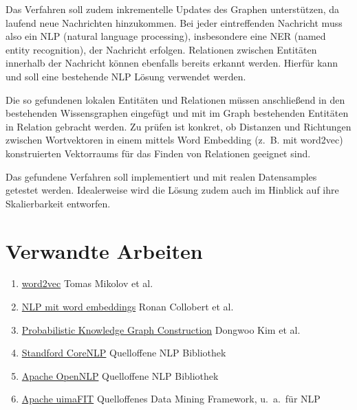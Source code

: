 \documentclass[12pt,a4paper,bibliography=totocnumbered,listof=totocnumbered]{scrartcl}
\begin{document}
Das Verfahren soll zudem inkrementelle Updates des Graphen unterstützen, da laufend neue Nachrichten hinzukommen. Bei jeder eintreffenden Nachricht muss also ein NLP (natural language processing), insbesondere eine NER (named entity recognition), der Nachricht erfolgen. Relationen zwischen Entitäten innerhalb der Nachricht können ebenfalls bereits erkannt werden. Hierfür kann und soll eine bestehende NLP Lösung verwendet werden.

Die so gefundenen lokalen Entitäten und Relationen müssen anschließend in den bestehenden Wissensgraphen eingefügt und mit im Graph bestehenden Entitäten in Relation gebracht werden. Zu prüfen ist konkret, ob Distanzen und Richtungen zwischen Wortvektoren in einem mittels Word Embedding (z.~B. mit word2vec) konstruierten Vektorraums für das Finden von Relationen geeignet sind.

Das gefundene Verfahren soll implementiert und mit realen Datensamples getestet werden. Idealerweise wird die Lösung zudem auch im Hinblick auf ihre Skalierbarkeit entworfen.

\section{Verwandte Arbeiten}
{\begin{enumerate}
	\item \href{http://papers.nips.cc/paper/5021-distributed-representations-of-words-and-phrases-and-their-compositionality.pdf}{word2vec} Tomas Mikolov et al.
	\item \href{https://arxiv.org/pdf/1103.0398.pdf}{NLP mit word embeddings} Ronan Collobert et al.
	\item \href{http://www.ong-home.my/papers/kim16knowledge-graph-long.pdf}{Probabilistic Knowledge Graph Construction} Dongwoo Kim et al.
	\item \href{http://stanfordnlp.github.io/CoreNLP/}{Standford CoreNLP} Quelloffene NLP Bibliothek
	\item \href{https://opennlp.apache.org/}{Apache OpenNLP\textsuperscript{\texttrademark}} Quelloffene NLP Bibliothek
	\item \href{https://uima.apache.org/uimafit.html}{Apache uimaFIT\textsuperscript{\texttrademark}} Quelloffenes Data Mining Framework, u.~a.\ für NLP
\end{enumerate}}
\end{document}
